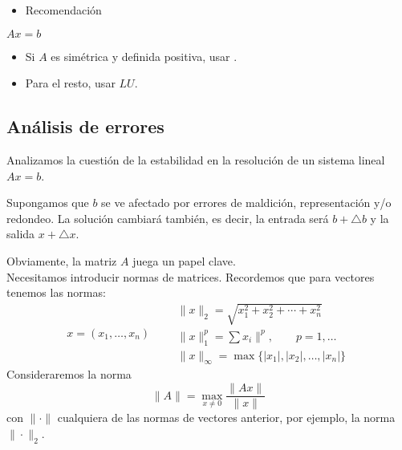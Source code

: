 
\begin{itemize}[label=\color{red}\textbullet, leftmargin=*]
	\item \color{lightblue}Recomendación
\end{itemize}
$Ax=b$
\begin{itemize}
	\item Si $A$ es simétrica y definida positiva, usar .
	\item Para el resto, usar $LU$.
\end{itemize}
\subsection{Análisis de errores}
Analizamos la cuestión de la estabilidad en la resolución de un sistema lineal $Ax=b$.

Supongamos que $b$ se ve afectado por errores de maldición, representación y/o redondeo. La solución cambiará también, es decir, la entrada será $b+\triangle b$ y la salida $x+\triangle x$.


Obviamente, la matriz $A$ juega un papel clave.\\
Necesitamos introducir normas de matrices. Recordemos que para vectores tenemos las normas:\[ x=(x_1,\dots,x_n)\qquad\begin{array}{l}
	\|x\|_2=\sqrt{x_1^2+x_2^2+\cdots+x_n^2}\\
	\|x\|_1^p=\sum x_i\|^p,\qquad p=1,\dots\\
	\|x\|_\infty=\max\{|x_1|,|x_2|,\dots,|x_n|\}
\end{array} \]Consideraremos la norma \[ \|A\|=\underset{x\neq0}{\max}\dfrac{\|Ax\|}{\|x\|} \]con $\|\cdot\|$ cualquiera de las normas de vectores anterior, por ejemplo, la norma $\|\cdot\|_2$.


